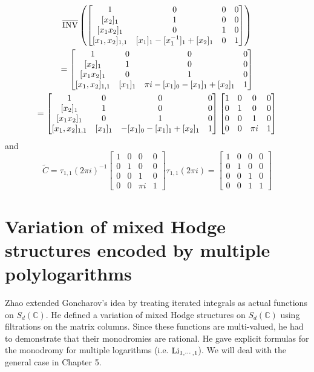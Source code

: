 \begin{example}
\begin{multline}
\overline{\operatorname{INV}}\left(\begin{bmatrix}
1&0&0&0\\
[x_2]_1&1&0&0\\
[x_1x_2]_1&0&1&0\\
[x_1,x_2]_{1,1}&[x_1]_1-[x_1^{-1}]_1+[x_2]_1&0&1
\end{bmatrix}\right)\\
=\begin{bmatrix}
1&0&0&0\\
[x_2]_1&1&0&0\\
[x_1x_2]_1&0&1&0\\
[x_1,x_2]_{1,1}&[x_1]_1&\pi i-[x_1]_0-[x_1]_1+[x_2]_1&1
\end{bmatrix}\\
=\begin{bmatrix}
1&0&0&0\\
[x_2]_1&1&0&0\\
[x_1x_2]_1&0&1&0\\
[x_1,x_2]_{1,1}&[x_1]_1&-[x_1]_0-[x_1]_1+[x_2]_1&1
\end{bmatrix}\begin{bmatrix}
1&0&0&0\\
0&1&0&0\\
0&0&1&0\\
0&0&\pi i&1
\end{bmatrix}
\end{multline}
and
\[
\widetilde C=\tau_{1,1}(2\pi i)^{-1}\begin{bmatrix}
1&0&0&0\\
0&1&0&0\\
0&0&1&0\\
0&0&\pi i&1
\end{bmatrix}\tau_{1,1}(2\pi i)=\begin{bmatrix}
1&0&0&0\\
0&1&0&0\\
0&0&1&0\\
0&0&1&1
\end{bmatrix}
\]
\end{example}

\section{Variation of mixed Hodge structures encoded by multiple polylogarithms}

Zhao extended Goncharov's idea by treating iterated integrals as actual functions on $S_d(\mathbb C)$. He defined a variation of mixed Hodge structures on $S_d(\mathbb C)$ using filtrations on the matrix columns. Since these functions are multi-valued, he had to demonstrate that their monodromies are rational. He gave explicit formulas for the monodromy for multiple logarithms (i.e. $\operatorname{Li}_{1,\cdots,1}$). We will deal with the general case in Chapter 5.

